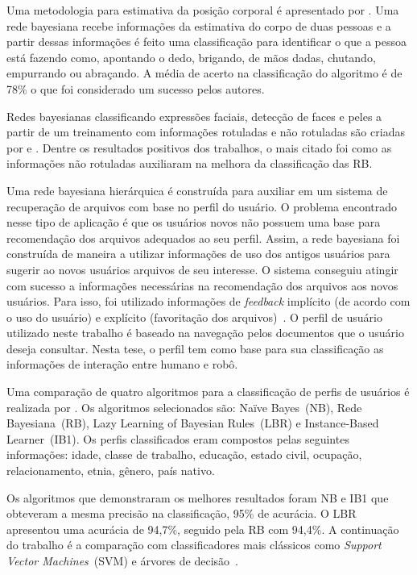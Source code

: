 Uma metodologia para estimativa da posição corporal é apresentado por . Uma rede bayesiana recebe informações da estimativa do corpo de duas pessoas e a partir dessas informações é feito uma classificação para identificar o que a pessoa está fazendo como, apontando o dedo, brigando, de mãos dadas, chutando, empurrando ou abraçando. A média de acerto na classificação do algoritmo é de 78\% o que foi considerado um sucesso pelos autores.

Redes bayesianas classificando expressões faciais, detecção de faces e peles a partir de um treinamento com informações rotuladas e não rotuladas são criadas por  e . Dentre os resultados positivos dos trabalhos, o mais citado foi como as informações não rotuladas auxiliaram na melhora da classificação das RB.

Uma rede bayesiana hierárquica é construída para auxiliar em um sistema de recuperação de arquivos com base no perfil do usuário. O problema encontrado nesse tipo de aplicação é que os usuários novos não possuem uma base para recomendação dos arquivos adequados ao seu perfil. Assim, a rede bayesiana foi construída de maneira a utilizar informações de uso dos antigos usuários para sugerir ao novos usuários arquivos de seu interesse. O sistema conseguiu atingir com sucesso a informações necessárias na recomendação dos arquivos aos novos usuários. Para isso, foi utilizado informações de \emph{feedback} implícito (de acordo com o uso do usuário) e explícito (favoritação dos arquivos)~\cite{zigoris:2006}. O perfil de usuário utilizado neste trabalho é baseado na navegação pelos documentos que o usuário deseja consultar. Nesta tese, o perfil tem como base para sua classificação as informações de interação entre humano e robô.

Uma comparação de quatro algoritmos para a classificação de perfis de usuários é realizada por . Os algoritmos selecionados são: Naïve Bayes~(NB), Rede Bayesiana~(RB), Lazy Learning of Bayesian Rules~(LBR) e Instance-Based Learner~(IB1). Os perfis classificados eram compostos pelas seguintes informações: idade, classe de trabalho, educação, estado civil, ocupação, relacionamento, etnia, gênero, país nativo.

Os algoritmos que demonstraram os melhores resultados foram NB e IB1 que obteveram a mesma precisão na classificação, 95\% de acurácia. O LBR apresentou uma acurácia de 94,7\%, seguido pela RB com 94,4\%. A continuação do trabalho é a comparação com classificadores mais clássicos como \emph{Support Vector Machines}~(SVM) e árvores de decisão~\cite{cufoglu:2008}.

